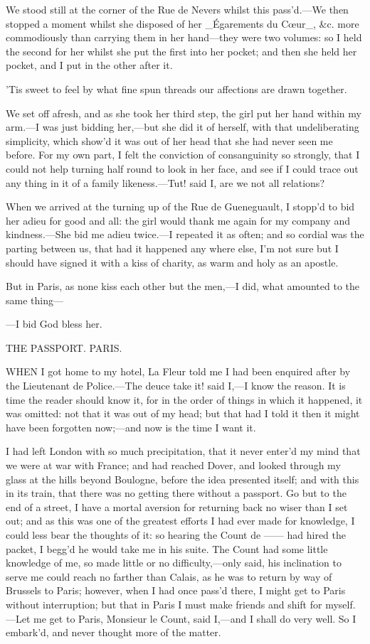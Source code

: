 \documentclass[twoside]{article}
\begin{document}
We stood still at the corner of the Rue de Nevers whilst this pass’d.—We
then stopped a moment whilst she disposed of her _Égarements du Cœur_,
&c. more commodiously than carrying them in her hand—they were two
volumes: so I held the second for her whilst she put the first into her
pocket; and then she held her pocket, and I put in the other after it.

’Tis sweet to feel by what fine spun threads our affections are drawn
together.

We set off afresh, and as she took her third step, the girl put her hand
within my arm.—I was just bidding her,—but she did it of herself, with
that undeliberating simplicity, which show’d it was out of her head that
she had never seen me before.  For my own part, I felt the conviction of
consanguinity so strongly, that I could not help turning half round to
look in her face, and see if I could trace out any thing in it of a
family likeness.—Tut! said I, are we not all relations?

When we arrived at the turning up of the Rue de Gueneguault, I stopp’d to
bid her adieu for good and all: the girl would thank me again for my
company and kindness.—She bid me adieu twice.—I repeated it as often; and
so cordial was the parting between us, that had it happened any where
else, I’m not sure but I should have signed it with a kiss of charity, as
warm and holy as an apostle.

But in Paris, as none kiss each other but the men,—I did, what amounted
to the same thing—

—I bid God bless her.




THE PASSPORT.
PARIS.


WHEN I got home to my hotel, La Fleur told me I had been enquired after
by the Lieutenant de Police.—The deuce take it! said I,—I know the
reason.  It is time the reader should know it, for in the order of things
in which it happened, it was omitted: not that it was out of my head; but
that had I told it then it might have been forgotten now;—and now is the
time I want it.

I had left London with so much precipitation, that it never enter’d my
mind that we were at war with France; and had reached Dover, and looked
through my glass at the hills beyond Boulogne, before the idea presented
itself; and with this in its train, that there was no getting there
without a passport.  Go but to the end of a street, I have a mortal
aversion for returning back no wiser than I set out; and as this was one
of the greatest efforts I had ever made for knowledge, I could less bear
the thoughts of it: so hearing the Count de —— had hired the packet, I
begg’d he would take me in his suite.  The Count had some little
knowledge of me, so made little or no difficulty,—only said, his
inclination to serve me could reach no farther than Calais, as he was to
return by way of Brussels to Paris; however, when I had once pass’d
there, I might get to Paris without interruption; but that in Paris I
must make friends and shift for myself.—Let me get to Paris, Monsieur le
Count, said I,—and I shall do very well.  So I embark’d, and never
thought more of the matter.
\end{document}
